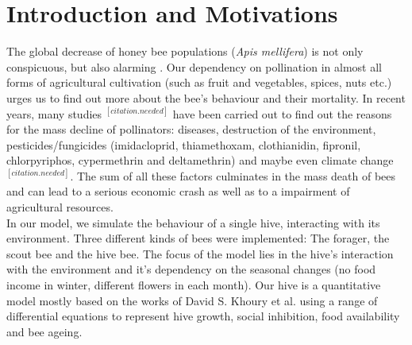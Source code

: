 \section{Introduction and Motivations}
The global decrease of honey bee populations (\textit{Apis mellifera}) is not only conspicuous, but also alarming \cite{potts10}\cite{thomann13}. Our dependency on pollination in almost all forms of agricultural cultivation (such as fruit and vegetables, spices, nuts etc.) urges us to find out more about the bee's behaviour and their mortality. In recent years, many studies $^{[citation.needed]}$ have been carried out to find out the reasons for the mass decline of pollinators: diseases, destruction of the environment, pesticides/fungicides (imidacloprid, thiamethoxam, clothianidin, fipronil, chlorpyriphos, cypermethrin and deltamethrin) and maybe even climate change $^{[citation.needed]}$. The sum of all these factors culminates in the mass death of bees and can lead to a serious economic crash as well as to a impairment of agricultural resources.\\
In our model, we simulate the behaviour of a single hive, interacting with its environment. Three different kinds of bees were implemented: The forager, the scout bee and the hive bee. The focus of the model lies in the hive's interaction with the environment and it's dependency on the seasonal changes (no food income in winter, different flowers in each month). Our hive is a quantitative model mostly based on the works of David S. Khoury et al. \cite{khoury13} using a range of differential equations to represent hive growth, social inhibition, food availability and bee ageing. 
